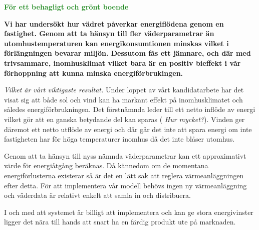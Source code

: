 \documentclass[11pt,a4paper]{article}
\begin{document}
\addtolength{\parindent}{-0.6 cm}
\pagestyle{fancy}
\rhead{\sc\footnotesize \today}
\mbox{}

\begin{center}
\textcolor{ForestGreen}{\textbf{\Huge För ett behagligt och grönt boende}}
\end{center}

\mbox{}

\setlength{\columnsep}{5mm}
\begin{multicols}{2}
\addtolength{\parskip}{1.3ex}
\normalsize

\textbf{Vi har undersökt hur vädret påverkar energiflödena genom en fastighet. Genom att ta hänsyn till fler väderparametrar än utomhustemperaturen kan energikonsumtionen minskas vilket i förlängningen bevarar miljön. Dessutom fås ett jämnare, och där med trivsammare, inomhusklimat vilket bara är en positiv bieffekt i vår förhoppning att kunna minska energiförbrukingen.}

\emph{\color{red} Vilket är vårt viktigaste resultat.}
Under loppet av vårt kandidatarbete har det visat sig att både sol och vind kan
ha markant effekt på inomhusklimatet och således energiförbrukningen. Det 
förstnämnda leder till ett netto inflöde av energi vilket gör att en ganska
betydande del kan sparas (\emph{\color{red} Hur mycket?}). Vinden
ger däremot ett netto utflöde av energi och där går det inte att spara energi
om inte fastigheten har för höga temperaturer inomhus då det inte blåser utomhus.

Genom att ta hänsyn till nyss nämnda väderparametrar kan ett approximativt
värde för energiåtgång beräknas. Då kännedom om de momentana energiförlusterna
existerar så är det en lätt sak att reglera värmeanläggningen efter detta.
För att implementera vår modell behövs ingen ny värmeanläggning och väderdata är relativt enkelt att samla in och distribuera. 

\begin{comment}
Är man en liten bostadsrättsförening eller bo i villa kanske man tycker att väderstationen är en stor utgift – då kan man gå ihop några grannar och samla in väderdata gemensamt.\end{comment}

I och med att systemet är billigt att implementera och kan ge stora energivinster ligger det nära till hands att snart ha en färdig produkt ute på marknaden.


\end{multicols}
\end{document}
